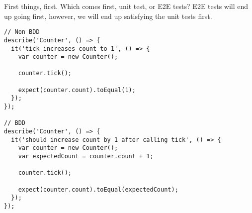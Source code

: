 First things, first. Which comes first, unit test, or E2E tests? E2E tests will
end up going first, however, we will end up satisfying the unit tests first.

\begin{lstlisting}
// Non BDD
describe('Counter', () => {
  it('tick increases count to 1', () => {
    var counter = new Counter();

    counter.tick();

    expect(counter.count).toEqual(1);
  });
});

// BDD
describe('Counter', () => {
  it('should increase count by 1 after calling tick', () => {
    var counter = new Counter();
    var expectedCount = counter.count + 1;

    counter.tick();

    expect(counter.count).toEqual(expectedCount);
  });
});
\end{lstlisting}
